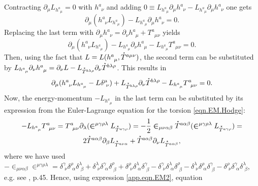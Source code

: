 \documentclass[
10pt, %
a4paper, %
oneside, %
headinclude,footinclude, %
BCOR5mm, %
]{scrartcl}
\newcommand{\pd}[1]{\partial_{#1}}
\newcommand{\tetrsymbol}{h}
\newcommand{\tetr}[2]{\tetrsymbol^{#1}_{\phantom{#1}#2}}
\newcommand{\Tors}[2]{T^{#1}_{\phantom{a}#2}}
\newcommand{\Laghodge}{L}%
\newcommand{\LCsymb}{\bm{\in}}    %
\newcommand{\HDT}[1]{\accentset{\star}{T}^{#1}}
\newcommand{\KD}[2]{\delta^{#1}_{\,\,#2}}
\begin{document}
Contracting $ \pd{\mu} \Laghodge_{\tetr{a}{\mu}} = 0 $ with $ \tetr{a}{\nu} $ and adding $ 0\equiv 
\Laghodge_{\tetr{a}{\mu}}\pd{\mu}\tetr{a}{\nu} -  \Laghodge_{\tetr{a}{\mu}}\pd{\mu}\tetr{a}{\nu} $ 
one gets
\begin{equation}
\pd{\mu}(\tetr{a}{\nu}\Laghodge_{\tetr{a}{\mu}}) - \Laghodge_{\tetr{a}{\mu}}\pd{\mu}\tetr{a}{\nu} = 
0.
\end{equation}
Replacing the last term with $ \pd{\mu}\tetr{a}{\nu} = \pd{\nu}\tetr{a}{\mu} + \Tors{a}{\mu\nu} $ 
yields
\begin{equation}
\pd{\mu}(\tetr{a}{\nu}\Laghodge_{\tetr{a}{\mu}}) - \Laghodge_{\tetr{a}{\mu}}\pd{\nu}\tetr{a}{\mu} - 
\Laghodge_{\tetr{a}{\mu}}\Tors{a}{\mu\nu} = 0.
\end{equation}
Then, using the fact that $ L = L(\tetr{a}{\mu},\HDT{a\mu\nu}) $, the second term can be 
substituted 
by $ \Laghodge_{\tetr{a}{\mu}}\pd{\nu}\tetr{a}{\mu} = \pd{\nu}\Laghodge - 
\Laghodge_{\HDT{b\lambda\rho}}\pd{\nu}\HDT{b\lambda\rho} $. This results in
\begin{equation}\label{app.eqn.EM1}
\pd{\mu}(\tetr{a}{\nu}\Laghodge_{\tetr{a}{\mu}} - L \delta^\mu_{\ \nu}) +
\Laghodge_{\HDT{b\lambda\rho}}\pd{\nu}\HDT{b\lambda\rho} -
\Laghodge_{\tetr{a}{\mu}}\Tors{a}{\mu\nu} = 0.
\end{equation} 
Now, the energy-momentum $ -\Laghodge_{\tetr{a}{\mu}} $ in the last term can be substituted by its 
expression from the Euler-Lagrange equation for the torsion \eqref{eqn.EM.Hodge}:
\begin{multline}\label{app.eqn.EM2}
	-\Laghodge_{\tetr{a}{\mu}}\Tors{a}{\mu\nu} = 
	\Tors{a}{\mu\nu}\pd{\lambda}(\LCsymb^{\mu\gamma\rho\lambda}\Laghodge_{\HDT{a\gamma\rho}}) =
	-\frac12\LCsymb_{\mu\nu\alpha\beta}\HDT{a\alpha\beta}(\LCsymb^{\mu\gamma\rho\lambda}\Laghodge_{\HDT{a\gamma\rho}})
	 =
	 \\
	2\HDT{a\alpha\beta}\pd{\beta}\Laghodge_{\HDT{a\nu\alpha}} + 
	\HDT{a\alpha\beta}\pd{\nu}\Laghodge_{\HDT{a\alpha\beta}},
\end{multline}
where we have used  $ 
-\LCsymb_{\mu\nu\alpha\beta}\LCsymb^{\mu\gamma\rho\lambda} = 
\KD{\gamma}{\nu}\KD{\rho}{\alpha}\KD{\lambda}{\beta} +
\KD{\lambda}{\nu}\KD{\gamma}{\alpha}\KD{\rho}{\beta} +
\KD{\rho}{\nu}\KD{\lambda}{\alpha}\KD{\gamma}{\beta} -
\KD{\gamma}{\nu}\KD{\lambda}{\alpha}\KD{\rho}{\beta} -
\KD{\lambda}{\nu}\KD{\rho}{\alpha}\KD{\gamma}{\beta} -
\KD{\rho}{\nu}\KD{\gamma}{\alpha}\KD{\lambda}{\beta}
$, e.g. see \cite{KleinertMultivalued}, p.45. Hence, using expression \eqref{app.eqn.EM2}, equation 
\end{document}
